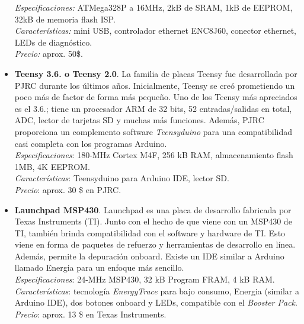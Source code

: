 \documentclass[12pt]{article}
\begin{document}
\begin{itemize}
		\textit{Especificaciones:} ATMega328P a 16MHz, 2kB de SRAM, 1kB de EEPROM, 32kB de memoria flash ISP.\\
		
		\textit{Características:} mini USB, controlador ethernet ENC8J60, conector ethernet, LEDs de diagnóstico.\\
		
		\textit{Precio:} aprox. 50\$.\\
		
		\item \textbf{Teensy 3.6. o Teensy 2.0}. La familia de placas Teensy fue desarrollada por PJRC durante los últimos años. Inicialmente, Teensy se creó prometiendo un poco más de factor de forma más pequeño. Uno de los Teensy más apreciados es el 3.6.; tiene un procesador ARM de 32 bits, 52 entradas/salidas en total, ADC, lector de tarjetas SD y muchas más funciones. Además, PJRC proporciona un complemento software \textit{Teensyduino} para una compatibilidad casi completa con los programas Arduino. \\ 
		
		\textit{Especificaciones}: 180-MHz Cortex M4F, 256 kB RAM, almacenamiento flash 1MB, 4K EEPROM. \\
		
		\textit{Características}: Teensyduino para Arduino IDE, lector SD. \\
		
		\textit{Precio}: aprox. 30 \$ en PJRC. \\
		
		\item \textbf{Launchpad MSP430}. Launchpad es una placa de desarrollo fabricada por Texas Instruments (TI). Junto con el hecho de que viene con un MSP430 de TI, también brinda compatibilidad con el software y hardware de TI. Esto viene en forma de paquetes de refuerzo y herramientas de desarrollo en línea. Además, permite la depuración onboard. Existe un IDE similar a Arduino llamado Energia para un enfoque más sencillo. \\
		
		\textit{Especificaciones}: 24-MHz MSP430, 32 kB Program FRAM, 4 kB RAM. \\
		
		\textit{Características}: tecnología \textit{EnergyTrace} para bajo consumo, Energia (similar a Arduino IDE), dos botones onboard y LEDs, compatible con el \textit{Booster Pack}. \\
		
		\textit{Precio}: aprox. 13 \$ en Texas Instruments. \\
		

\end{itemize}
\end{document}
